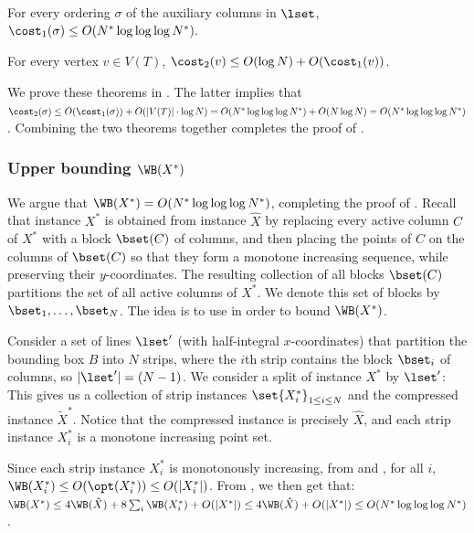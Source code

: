 \documentclass{toc}
\begin{document}
\begin{theorem}\label{thm: crossings inside instances}
	For every ordering $\sigma$ of the auxiliary columns in $\lset$, $\cost_1(\sigma)\leq O(N^*\log\log\log N^*).$
	\end{theorem}


\begin{theorem}\label{thm: bound cost 2}
	For every vertex $v\in V(T)$, $\cost_2(v)\leq O(\log N)+O(\cost_1(v))$.
\end{theorem}


We prove these theorems in   . 
The latter implies that $\cost_2(\sigma)\leq O(\cost_1(\sigma))+O(|V(T)|\cdot \log N)=O(N^*\log\log\log N^*)+O(N\log N)=O(N^*\log\log\log N^*)$. Combining the two theorems together completes the proof of .



%
%
%
%
%
%
%
\subsubsection{Upper bounding $\WB(X^*)$}

We argue that $\WB(X^*)=O(N^*\log\log\log N^*)$, completing the proof of . 
Recall that instance $X^*$ is obtained from instance $\hat X$ by replacing every active column $C$ of $X^*$ with a block $\bset(C)$ of columns, and then placing the points of $C$ on the columns of $\bset(C)$ so that they form a monotone increasing sequence, while preserving their $y$-coordinates. 
The resulting collection of all blocks $\bset(C)$ partitions the set of all active columns of $X^*$. We denote this set of blocks by $\bset_1,\ldots,\bset_N$. 
The idea is to use  in order to bound $\WB(X^*)$. 


Consider a set of lines $\lset'$ (with half-integral $x$-coordinates) that partition the bounding box $B$ into $N$ strips, where the $i$th strip contains the block $\bset_i$ of columns, so $|\lset'| = (N-1)$. 
We consider a split of instance $X^*$ by $\lset'$: This gives us  a collection of strip instances $\set{X^*_i}_{1\leq i\leq N}$ and the compressed instance $\widetilde{X}^*$. 
Notice that the compressed instance is precisely $\hat{X}$, and each strip instance $X^*_i$ is a monotone increasing point set.   


%
Since each strip instance $X^*_i$ is monotonously increasing, from  and , for all $i$, $\WB(X^*_i)\leq O(\opt(X^*_i))\leq O(|X^*_i|)$. From , we then get that:
$\WB(X^*)\leq 4\WB(\hat X)+8\sum_i\WB(X^*_i)+O(|X^*|)\leq 4\WB(\hat X)+O(|X^*|)\leq O(N^*\log\log\log N^*)$.
\end{document}

